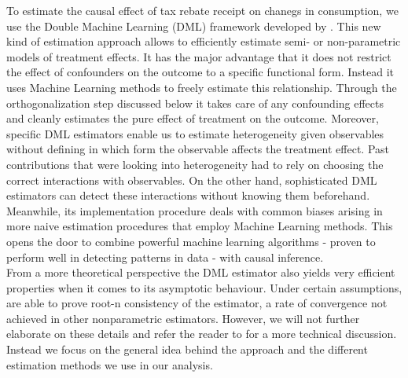 To estimate the causal effect of tax rebate receipt on chanegs in consumption, we use the Double Machine Learning (DML) framework developed by \cite{DML2017}. This new kind of estimation approach allows to efficiently estimate semi- or non-parametric models of treatment effects. It has the major advantage that it does not restrict the effect of confounders on the outcome to a specific functional form. Instead it uses Machine Learning methods to freely estimate this relationship. Through the orthogonalization step discussed below it takes care of any confounding effects and cleanly estimates the pure effect of treatment on the outcome. Moreover, specific DML estimators enable us to estimate heterogeneity given observables without defining in which form the observable affects the treatment effect. Past contributions that were looking into heterogeneity had to rely on choosing the correct interactions with observables. On the other hand, sophisticated DML estimators can detect these interactions without knowing them beforehand. \\
Meanwhile, its implementation procedure deals with common biases arising in more naive estimation procedures that employ Machine Learning methods. This opens the door to combine powerful machine learning algorithms - proven to perform well in detecting patterns in data - with causal inference. \\
From a more theoretical perspective the DML estimator also yields very efficient properties when it comes to its asymptotic behaviour. Under certain assumptions, \cite{DML2017} are able to prove root-n consistency of the estimator, a rate of convergence not achieved in other nonparametric estimators. However, we will not further elaborate on these details and refer the reader to \cite{DML2017} for a more technical discussion. Instead we focus on the general idea behind the approach and the different estimation methods we use in our analysis.

